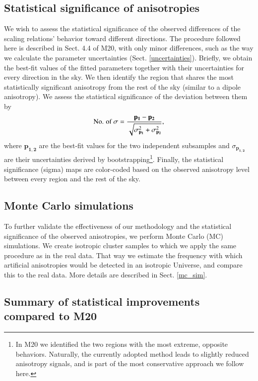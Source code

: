 \documentclass{aa}   %
\begin{document}
\subsection{Statistical significance of anisotropies}\label{stat_sign}

We wish to assess the statistical significance of the observed differences of the scaling relations' behavior toward different directions. The procedure followed here is described in Sect. 4.4 of M20, with only minor differences, such as the way we calculate the parameter uncertainties (Sect. \ref{uncertainties}). Briefly, we obtain the best-fit values of the fitted parameters together with their uncertainties for every direction in the sky. We then identify the region that shares the most statistically significant anisotropy from the rest of the sky (similar to a dipole anisotropy). We assess the statistical significance of the deviation between them by
\begin{equation}
\centering
\text{No. of }\sigma=\dfrac{\mathbf{p_1}-\mathbf{p_2}}{\sqrt{\sigma^2_{\mathbf{p_1}}+\sigma^2_{\mathbf{p_2}}}},
\label{sigma_sig}
\end{equation}
where $\mathbf{p_{1,2}}$ are the best-fit values for the two independent subsamples and $\sigma_{\mathbf{p_{1,2}}}$ are their uncertainties derived by bootstrapping\footnote{In M20 we identified the two regions with the most extreme, opposite behaviors. Naturally, the currently adopted method leads to slightly reduced anisotropy signals, and is part of the most conservative approach we follow here.}. Finally, the statistical significance (sigma) maps are color-coded based on the observed anisotropy level between every region and the rest of the sky.

\subsection{Monte Carlo simulations}

To further validate the effectiveness of our methodology and the statistical significance of the observed anisotropies, we perform Monte Carlo (MC) simulations. We create isotropic cluster samples to which we apply the same procedure as in the real data. That way we estimate the frequency with which artificial anisotropies would be detected in an isotropic Universe, and compare this to the real data. More details are described in Sect. \ref{mc_sim}.

\subsection{Summary of statistical improvements compared to M20} \label{differences}
\end{document}
